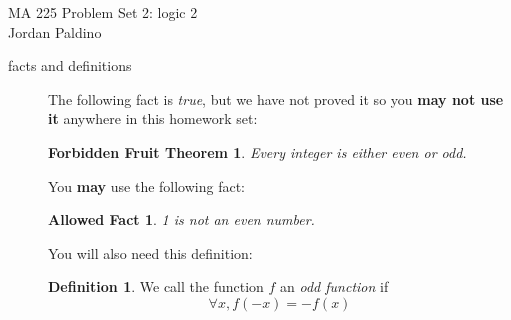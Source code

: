 \documentclass{letter}
\newtheorem*{theorem*}{Forbidden Fruit Theorem}
\newtheorem*{allowed}{Allowed Fact}
\theoremstyle{definition}
\newtheorem*{definition}{Definition}
\begin{document}
\pagestyle{empty}

{\Large MA 225 Problem Set 2: logic 2}\\
Jordan Paldino

\begin{description}
\item[facts and definitions] The following fact is {\em true}, but we have not proved it so you {\bfseries may not use it} anywhere in this homework set:
\begin{theorem*}
	Every integer is either even or odd.
\end{theorem*}

You {\bfseries may} use the following fact:
\begin{allowed}
	1 is not an even number.
\end{allowed}

You will also need this definition:
\begin{definition}
	We call the function $f$ an {\em odd function} if $$\forall x, f(-x)=-f(x)$$  
	

\end{definition}
\end{description}
\end{document}
